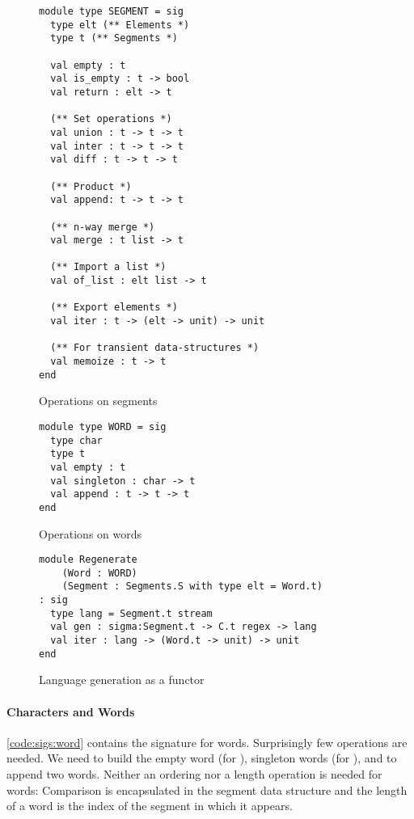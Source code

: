 \begin{figure}[tp]
  \centering
\begin{lstlisting}[basicstyle=\scriptsize\ttfamily]
module type SEGMENT = sig
  type elt (** Elements *)
  type t (** Segments *)

  val empty : t
  val is_empty : t -> bool
  val return : elt -> t

  (** Set operations *)
  val union : t -> t -> t
  val inter : t -> t -> t
  val diff : t -> t -> t

  (** Product *)
  val append: t -> t -> t

  (** n-way merge *)
  val merge : t list -> t

  (** Import a list *)
  val of_list : elt list -> t

  (** Export elements *)
  val iter : t -> (elt -> unit) -> unit

  (** For transient data-structures *)
  val memoize : t -> t
end
\end{lstlisting}
    \caption{Operations on segments}
    \label{code:sigs:segment}
    
\begin{lstlisting}[basicstyle=\scriptsize\ttfamily]
module type WORD = sig
  type char
  type t
  val empty : t
  val singleton : char -> t
  val append : t -> t -> t
end
\end{lstlisting}
    \caption{Operations on words}
    \label{code:sigs:word}
    
\begin{lstlisting}[basicstyle=\scriptsize\ttfamily]
module Regenerate
    (Word : WORD)
    (Segment : Segments.S with type elt = Word.t)
: sig
  type lang = Segment.t stream
  val gen : sigma:Segment.t -> C.t regex -> lang
  val iter : lang -> (Word.t -> unit) -> unit
end
\end{lstlisting}
    \caption{Language generation as a functor}
    \label{code:sigs:regen}
\end{figure}

\paragraph{Characters and Words}

\autoref{code:sigs:word} contains the signature for words.
Surprisingly few operations are needed. We need to build the empty word (for ),
singleton words (for ), and to append two words.
Neither an ordering nor a length operation is needed for words:
Comparison is encapsulated in the segment
data structure and the length of a word is the index of the segment in
which it appears.

